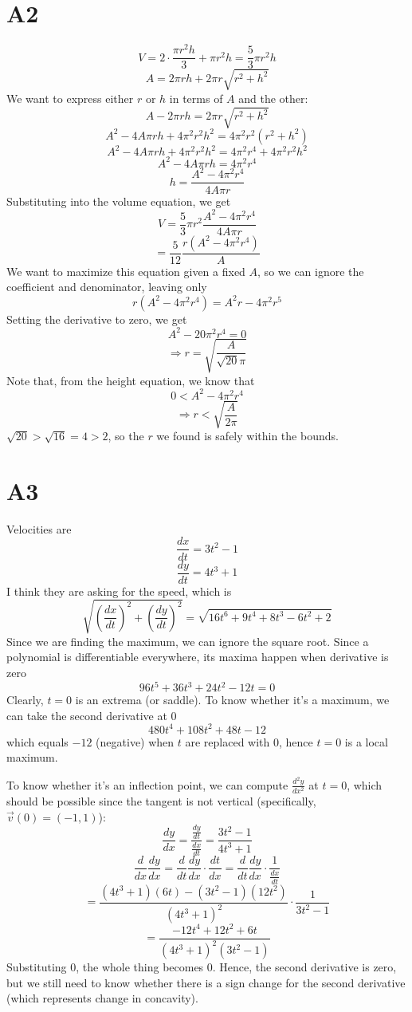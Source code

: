\documentclass{book}
\begin{document}
\section*{A2}
$$V = 2 \cdot \frac{\pi r^2 h}{3} + \pi r^2 h = \frac{5}{3} \pi r^2 h$$
$$A = 2\pi rh + 2 \pi r \sqrt{r^2 + h^2}$$
We want to express either $r$ or $h$ in terms of $A$ and the other:
$$A - 2\pi rh = 2\pi r \sqrt{r^2 + h^2}$$
$$A^2 - 4A\pi rh + 4\pi^2 r^2 h^2 = 4\pi^2 r^2 (r^2 + h^2)$$
$$A^2 - 4A\pi rh + 4\pi^2 r^2 h^2 = 4 \pi^2 r^4 + 4\pi^2 r^2 h^2$$
$$A^2 - 4A\pi rh = 4 \pi^2 r^4$$
$$h = \frac{A^2 - 4\pi^2 r^4}{4A\pi r}$$
Substituting into the volume equation, we get
$$V = \frac{5}{3} \pi r^2 \frac{A^2 - 4\pi^2 r^4}{4A\pi r}$$
$$= \frac{5}{12} \frac{r(A^2 - 4\pi^2 r^4)}{A}$$
We want to maximize this equation given a fixed $A$, so we can ignore the coefficient and denominator, leaving only
$$r(A^2 - 4\pi^2 r^4) = A^2 r - 4\pi^2 r^5$$
Setting the derivative to zero, we get
$$A^2 - 20\pi^2 r^4 = 0$$
$$\Rightarrow r = \sqrt{\frac{A}{\sqrt{20}\pi}}$$
Note that, from the height equation, we know that
$$0 < A^2 - 4\pi^2 r^4$$
$$\Rightarrow r < \sqrt{\frac{A}{2\pi}}$$
$\sqrt{20} > \sqrt{16} = 4 > 2$, so the $r$ we found is safely within the bounds.

\section*{A3}
Velocities are
$$\frac{dx}{dt} = 3t^2 - 1$$
$$\frac{dy}{dt} = 4t^3 + 1$$
I think they are asking for the speed, which is
$$\sqrt{\left( \frac{dx}{dt} \right)^2 + \left( \frac{dy}{dt} \right)^2} = \sqrt{16t^6 + 9t^4 + 8t^3 - 6t^2 + 2}$$
Since we are finding the maximum, we can ignore the square root. Since a polynomial is differentiable everywhere, its maxima happen when derivative is zero
$$96t^5 + 36t^3 + 24t^2 - 12t = 0$$
Clearly, $t = 0$ is an extrema (or saddle). To know whether it's a maximum, we can take the second derivative at $0$
$$480t^4 + 108t^2 + 48t - 12$$
which equals $-12$ (negative) when $t$ are replaced with $0$, hence $t = 0$ is a local maximum.

To know whether it's an inflection point, we can compute $\frac{d^2y}{dx^2}$ at $t = 0$, which should be possible since the tangent is not vertical (specifically, $\vec{v}(0) = (-1, 1)$):
$$\frac{dy}{dx} = \frac{\frac{dy}{dt}}{\frac{dx}{dt}} = \frac{3t^2 - 1}{4t^3 + 1}$$
$$\frac{d}{dx} \frac{dy}{dx} = \frac{d}{dt} \frac{dy}{dx} \cdot \frac{dt}{dx} = \frac{d}{dt} \frac{dy}{dx} \cdot \frac{1}{\frac{dx}{dt}}$$
$$= \frac{(4t^3 + 1)(6t) - (3t^2 - 1)(12t^2)}{(4t^3 + 1)^2} \cdot \frac{1}{3t^2 - 1}$$
$$= \frac{-12t^4 + 12t^2 + 6t}{(4t^3 + 1)^2(3t^2 - 1)}$$
Substituting $0$, the whole thing becomes $0$. Hence, the second derivative is zero, but we still need to know whether there is a sign change for the second derivative (which represents change in concavity).
\end{document}
